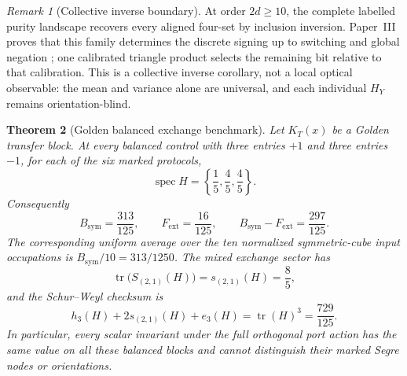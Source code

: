 \documentclass[11pt]{article}
\newtheorem{theorem}{Theorem}[section]
\theoremstyle{remark}
\newtheorem{remark}[theorem]{Remark}
\begin{document}
\begin{remark}[Collective inverse boundary]
At order \(2d\geq10\), the complete labelled purity landscape recovers every
aligned four-set by inclusion inversion.  Paper~III proves that this family
determines the discrete signing up to switching and global negation
\cite[Theorem~5.2]{ClebschIII}; one calibrated triangle product selects the
remaining bit relative to that calibration.  This is a collective inverse
corollary, not a local optical observable: the mean and variance alone are
universal, and each individual \(H_Y\) remains orientation-blind.
\end{remark}

\begin{theorem}[Golden balanced exchange benchmark]
\label{thm:exchange-boundary}
Let \(K_T(x)\) be a Golden transfer block.  At every balanced control with
three entries \(+1\) and three entries \(-1\), for each of the six marked
protocols,
\[
 \operatorname{spec}H=\left\{\frac15,\frac45,\frac45\right\}.
\]
Consequently
\[
 B_{\mathrm{sym}}=\frac{313}{125},\qquad
 F_{\mathrm{ext}}=\frac{16}{125},\qquad
 B_{\mathrm{sym}}-F_{\mathrm{ext}}=\frac{297}{125}.
\]
The corresponding uniform average over the ten normalized symmetric-cube
input occupations is \(B_{\mathrm{sym}}/10=313/1250\).
The mixed exchange sector has
\[
 \operatorname{tr}\bigl(S_{(2,1)}(H)\bigr)=s_{(2,1)}(H)=\frac85,
\]
and the Schur--Weyl checksum is
\[
 h_3(H)+2s_{(2,1)}(H)+e_3(H)
 =\operatorname{tr}(H)^3=\frac{729}{125}.
\]
In particular, every scalar invariant under the full orthogonal port action
has the same value on all these balanced blocks and cannot distinguish their
marked Segre nodes or orientations.
\end{theorem}
\end{document}
